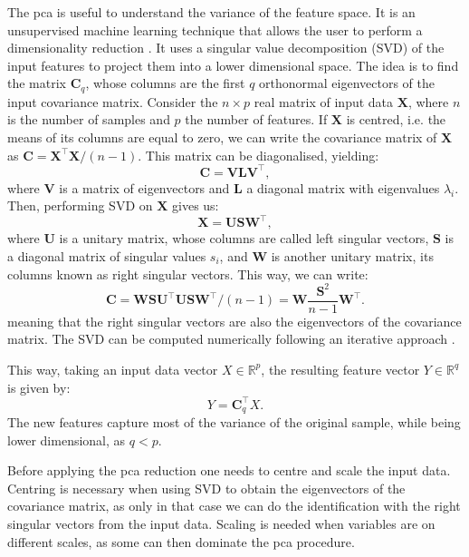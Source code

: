 The \gls{pca} is useful to understand the variance of the feature space. It is an unsupervised machine learning technique that allows the user to perform a dimensionality reduction \cite{Jolliffe2016}. It uses a singular value decomposition (SVD) of the input features to project them into a lower dimensional space. The idea is to find the matrix $\mathbf{C}_{q}$, whose columns are the first $q$ orthonormal eigenvectors of the input covariance matrix. Consider the $n \times p$ real matrix of input data $\mathbf{X}$, where $n$ is the number of samples and $p$ the number of features. If $\mathbf{X}$ is centred, i.e. the means of its columns are equal to zero, we can write the covariance matrix of $\mathbf{X}$ as $\mathbf{C}=\mathbf{X}^{\intercal}\mathbf{X}/(n-1)$. This matrix can be diagonalised, yielding:
\begin{equation}
	\mathbf{C}=\mathbf{V}\mathbf{L}\mathbf{V}^{\intercal},
\end{equation}
where $\mathbf{V}$ is a matrix of eigenvectors and $\mathbf{L}$ a diagonal matrix with eigenvalues $\lambda_{i}$. Then, performing SVD on $\mathbf{X}$ gives us:
\begin{equation}
	\mathbf{X}=\mathbf{U}\mathbf{S}\mathbf{W}^{\intercal},
\end{equation}
where $\mathbf{U}$ is a unitary matrix, whose columns are called left singular vectors, $\mathbf{S}$ is a diagonal matrix of singular values $s_{i}$, and $\mathbf{W}$ is another unitary matrix, its columns known as right singular vectors. This way, we can write:
\begin{equation}
	\mathbf{C}=\mathbf{W}\mathbf{S}\mathbf{U}^{\intercal}\mathbf{U}\mathbf{S}\mathbf{W}^{\intercal}/(n-1)=\mathbf{W}\frac{\mathbf{S}^{2}}{n-1}\mathbf{W}^{\intercal}.
\end{equation}
meaning that the right singular vectors are also the eigenvectors of the covariance matrix. The SVD can be computed numerically following an iterative approach \cite{Golub1970}.

This way, taking an input data vector $X \in \mathbb{R}^{p}$, the resulting feature vector $Y \in \mathbb{R}^{q}$ is given by:
\begin{equation}
	Y = \mathbf{C}_{q}^{\intercal} X.
\end{equation}
The new features capture most of the variance of the original sample, while being lower dimensional, as $q<p$.

Before applying the \gls{pca} reduction one needs to centre and scale the input data. Centring is necessary when using SVD to obtain the eigenvectors of the covariance matrix, as only in that case we can do the identification with the right singular vectors from the input data. Scaling is needed when variables are on different scales, as some can then dominate the \gls{pca} procedure.

